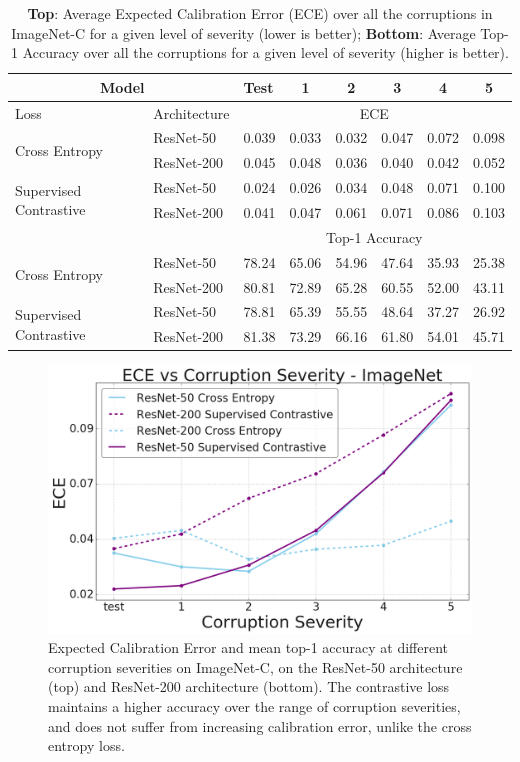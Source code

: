 \begin{table}[ht]
    \centering
    \begin{tabular}{p{}llccccc}\toprule
        \multicolumn{2}{c}{Model}&
        Test & {1} & {2} & {3} & {4} & {5} \\\midrule
        Loss& Architecture & \multicolumn{6}{c}{ECE}\\\midrule
        \multirow{2}{0.17\textwidth}{Cross Entropy} & ResNet-50  & 0.039 & 0.033 & 0.032 & 0.047 & 0.072 & 0.098\\
        & ResNet-200  & 0.045 & 0.048 & 0.036 & 0.040 & 0.042 & 0.052 \\ 
        \midrule
        \multirow{2}{0.17\textwidth}{Supervised  Contrastive} & ResNet-50  & 0.024 & 0.026 & 0.034 & 0.048 & 0.071 & 0.100 \\ 
        & ResNet-200  & 0.041 & 0.047 & 0.061 & 0.071 & 0.086 & 0.103 \\\midrule
        & & \multicolumn{6}{c}{Top-1 Accuracy}\\\midrule
        \multirow{2}{0.17\textwidth}{Cross Entropy} & ResNet-50  & 78.24 & 65.06 & 54.96 & 47.64 & 35.93 & 25.38 \\ 
        & ResNet-200  & 80.81 & 72.89 & 65.28 & 60.55 & 52.00 & 43.11\\
        \midrule
        \multirow{2}{0.17\textwidth}{Supervised Contrastive} & ResNet-50  & 78.81 & 65.39 & 55.55 & 48.64 & 37.27 & 26.92 \\
         & ResNet-200  & 81.38 & 73.29 & 66.16 & 61.80 & 54.01 & 45.71 \\ \bottomrule
    \end{tabular}
    \vspace{2mm}
    \caption{{\bf{Top}}: Average Expected Calibration Error (ECE) over all the corruptions in ImageNet-C \cite{hendrycks2019benchmarking} for a given level of severity (lower is better); {\bf{Bottom}}: Average Top-1 Accuracy over all the corruptions for a given level of severity (higher is better).}
    \label{tab:severity}
\end{table}


\begin{figure}  
    \centering
    \includegraphics[width=0.45\linewidth]{figs/corrupt_ece.png}
    \caption{Expected Calibration Error and mean top-1 accuracy at different corruption severities on ImageNet-C, on the ResNet-50 architecture (top) and ResNet-200 architecture (bottom). The contrastive loss maintains a higher accuracy over the range of corruption severities, and does not suffer from increasing calibration error, unlike the cross entropy loss.}
  \label{fig:robustness}
\end{figure}




